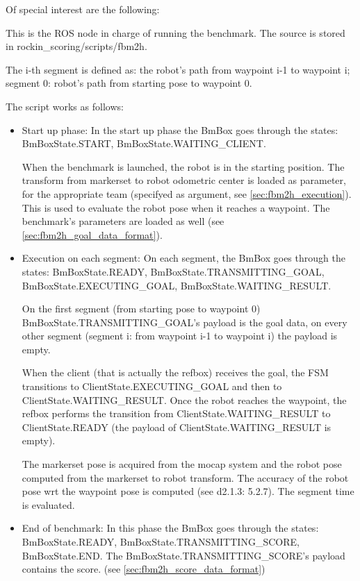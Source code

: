 \documentclass[a4paper]{article}
\begin{document}
Of special interest are the following:

\label{sec:fbm2h_benchmark_node}

This is the ROS node in charge of running the benchmark.
The source is stored in rockin\_scoring/scripts/fbm2h.

The i-th segment is defined as: the robot's path from waypoint i-1 to waypoint i; segment 0: robot's path from starting pose to waypoint 0.

The script works as follows:

\begin{itemize}
  \item Start up phase:
In the start up phase the BmBox goes through the states: BmBoxState.START, BmBoxState.WAITING\_CLIENT.

When the benchmark is launched, the robot is in the starting position.
The transform from markerset to robot odometric center is loaded as parameter, for the appropriate team (specifyed as argument, see \ref{sec:fbm2h_execution}).
This is used to evaluate the robot pose when it reaches a waypoint.
The benchmark's parameters are loaded as well (see \ref{sec:fbm2h_goal_data_format}).

  \item Execution on each segment:
On each segment, the BmBox goes through the states: BmBoxState.READY, BmBoxState.TRANSMITTING\_GOAL, BmBoxState.EXECUTING\_GOAL, BmBoxState.WAITING\_RESULT.

On the first segment (from starting pose to waypoint 0) BmBoxState.TRANSMITTING\_GOAL's payload is the goal data, on every other segment (segment i: from waypoint i-1 to waypoint i) the payload is empty.

When the client (that is actually the refbox) receives the goal, the FSM transitions to ClientState.EXECUTING\_GOAL and then to ClientState.WAITING\_RESULT.
Once the robot reaches the waypoint, the refbox performs the transition from ClientState.WAITING\_RESULT to ClientState.READY (the payload of ClientState.WAITING\_RESULT is empty).

The markerset pose is acquired from the mocap system and the robot pose computed from the markerset to robot transform.
The accuracy of the robot pose wrt the waypoint pose is computed (see d2.1.3: 5.2.7).
The segment time is evaluated.

  \item End of benchmark:
In this phase the BmBox goes through the states: BmBoxState.READY, BmBoxState.TRANSMITTING\_SCORE, BmBoxState.END.
The BmBoxState.TRANSMITTING\_SCORE's payload contains the score. (see \ref{sec:fbm2h_score_data_format})
\end{itemize}
\end{document}
